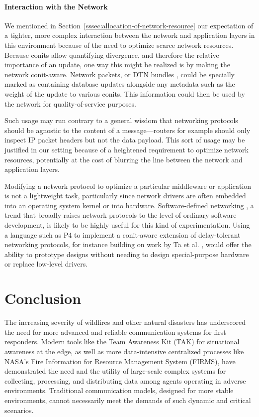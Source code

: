 \documentclass[]             %
{NASA}                       %
\theoremstyle{definition}
\begin{document}
\paragraph{Interaction with the Network}
We mentioned in Section~\ref{sssec:allocation-of-network-resource} our
expectation of a tighter, more complex interaction between the network
and application layers in this environment because of the need to
optimize scarce network resources. Because conits allow quantifying
divergence, and therefore the relative importance of an update, one
way this might be realized is by making the network
conit-aware. Network packets, or DTN bundles \cite{2021:intro-dtn},
could be specially marked as containing database updates alongside any
metadata such as the weight of the update to various conits. This
information could then be used by the network for quality-of-service
purposes.

Such usage may run contrary to a general wisdom that networking
protocols should be agnostic to the content of a message---routers for
example should only inspect IP packet headers but not the data
payload. This sort of usage may be justified in our setting because of
a heightened requirement to optimize network resources, potentially
at the cost of blurring the line between the network and application
layers.

Modifying a network protocol to optimize a particular middleware or
application is not a lightweight task, particularly since network
drivers are often embedded into an operating system kernel or into
hardware. Software-defined networking \cite{2016:sdn-battlefield}, a
trend that broadly raises network protocols to the level of ordinary
software development, is likely to be highly useful for this kind of
experimentation. Using a language such as P4 \cite{2014:p4} to
implement a conit-aware extension of delay-tolerant networking
protocols, for instance building on work by Ta et
al. \cite{2023:towards-sdn-dtn}, would offer the ability to prototype
designs without needing to design special-purpose hardware or replace
low-level drivers.

\section{Conclusion}
\label{sec:conclusion}
The increasing severity of wildfires and other natural disasters has
underscored the need for more advanced and reliable communication
systems for first responders. Modern tools like the Team Awareness Kit
(TAK) for situational awareness at the edge, as well as more
data-intensive centralized processes like NASA's Fire Information for
Resource Management System (FIRMS), have demonstrated the need and the
utility of large-scale complex systems for collecting, processing, and
distributing data among agents operating in adverse environments.
Traditional communication models, designed for more stable
environments, cannot necessarily meet the demands of such dynamic and
critical scenarios.
\end{document}
